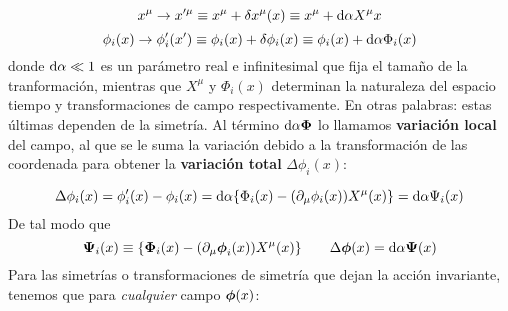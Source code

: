 \begin{equation}
	x^\mu \rightarrow x'^\mu \equiv x^\mu + \delta x^\mu (x) \equiv x^\mu + \mathrm{d} \alpha X^\mu x 
\end{equation}
\begin{equation}
	\phi_i(x) \rightarrow \phi_i'(x') \equiv \phi_i (x)+ \delta \phi_i (x) \equiv \phi_i(x) + \mathrm{d} \alpha \Phi_i (x)
\end{equation}
donde $\mathrm{d} \alpha\ll 1$ es un parámetro real e infinitesimal que fija el tamaño de la tranformación, mientras que $X^\mu$ y $\Phi_i(x)$ determinan la naturaleza del espacio tiempo y transformaciones de campo respectivamente. En otras palabras: estas últimas dependen de la simetría. Al término $\mathrm{d} \alpha \boldsymbol{\Phi}$ lo llamamos \textbf{variación local} del campo, al que se le suma la variación debido a la transformación de las coordenada para obtener la \textbf{variación total} $\Delta \phi_i(x)$:

\begin{equation}
	\Delta \phi_i (x) = \phi_i'(x) -\phi_i(x)  = \mathrm{d} \alpha \{ \Phi_i (x) - (\partial_\mu \phi_i (x))X^\mu(x) \}  = \mathrm{d} \alpha \Psi_i(x)
\end{equation} 
De tal modo que 
\begin{equation}
	\boldsymbol{\Psi}_i(x)\equiv \{ \boldsymbol{\Phi}_i (x) - (\partial_\mu \boldsymbol{\phi}_i (x))X^\mu(x) \}  \qquad \Delta \boldsymbol{\phi} (x) = \mathrm{d} \alpha \boldsymbol{\Psi} (x)
\end{equation}
Para las simetrías o transformaciones de simetría que dejan la acción invariante, tenemos que para \textit{cualquier} campo $\boldsymbol{\phi}(x)$:

